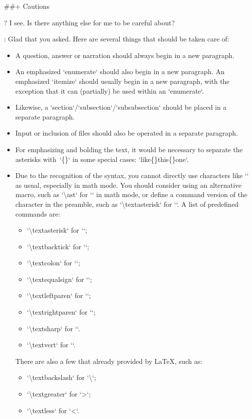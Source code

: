 \documentclass[%
  use style = classical,
  scroll,
]{Q-and-A}
\begin{document}
##+ {Cautions}

?
  I see. Is there anything else for me to be careful about?

:
  Glad that you asked. Here are several things that should be taken care of:
  \begin{itemize}
    \item A question, answer or narration should always begin in a new paragraph.
    \item An emphasized `enumerate` should also begin in a new paragraph. An emphasized `itemize` should usually begin in a new paragraph, with the exception that it can (partially) be used within an `enumerate`.
    \item Likewise, a `section`/`subsection`/`subsubsection` should be placed in a separate paragraph.
    \item Input or inclusion of files should also be operated in a separate paragraph.
    \item For emphasizing and bolding the text, it would be necessary to separate the asterisks with~`\{\}` in some special cases: `\textasterisk\textasterisk like\textasterisk\textasterisk\{\}\textasterisk\textasterisk\textasterisk this\textasterisk\textasterisk\textasterisk\{\}\textasterisk one\textasterisk`.
    \item Due to the recognition of the syntax, you cannot directly use characters like `\textasterisk` as usual, especially in math mode. You should consider using an alternative macro, such as `\textbackslash ast` for `\textasterisk` in math mode, or define a command version of the character in the preamble, such as `\textbackslash textasterisk` for `\textasterisk`. A list of predefined commands are:
    \begin{itemize}
      \item `\textbackslash textasterisk` for `\textasterisk`;
      \item `\textbackslash textbacktick` for `\textbacktick`;
      \item `\textbackslash textcolon` for `\textcolon`;
      \item `\textbackslash textequalsign` for `\textequalsign`;
      \item `\textbackslash textleftparen` for `\textleftparen`;
      \item `\textbackslash textrightparen` for `\textrightparen`;
      \item `\textbackslash textsharp` for `\textsharp`.
      \item `\textbackslash textvert` for `\textvert`.
    \end{itemize}
    There are also a few that already provided by \LaTeX, such as:
    \begin{itemize}
      \item `\textbackslash textbackslash` for `\textbackslash`;
      \item `\textbackslash textgreater` for `\textgreater`;
      \item `\textbackslash textless` for `\textless`.
    \end{itemize}
  \end{itemize}
\end{document}
